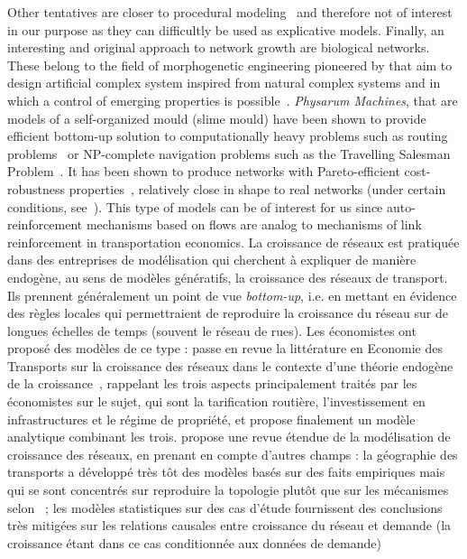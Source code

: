 {Other tentatives \cite{de2007netlogo,yamins2003growing} are closer to procedural modeling~\cite{lechner2004procedural,watson2008procedural} and therefore not of interest in our purpose as they can difficultly be used as explicative models. Finally, an interesting and original approach to network growth are biological networks. These belong to the field of morphogenetic engineering pioneered by  that aim to design artificial complex system inspired from natural complex systems and in which a control of emerging properties is possible~\cite{doursat2012morphogenetic}. \emph{Physarum Machines}, that are models of a self-organized mould (slime mould) have been shown to provide efficient bottom-up solution to computationally heavy problems such as routing problems~\cite{tero2006physarum} or NP-complete navigation problems such as the Travelling Salesman Problem~\cite{zhu2013amoeba}. It has been shown to produce networks with Pareto-efficient cost-robustness properties~\cite{tero2010rules}, relatively close in shape to real networks (under certain conditions, see~\cite{adamatzky2010road}). This type of models can be of interest for us since auto-reinforcement mechanisms based on flows are analog to mechanisms of link reinforcement in transportation economics.
}{
La croissance de réseaux est pratiquée dans des entreprises de modélisation qui cherchent à expliquer de manière endogène, au sens de modèles génératifs, la croissance des réseaux de transport. Ils prennent généralement un point de vue \emph{bottom-up}, i.e. en mettant en évidence des règles locales qui permettraient de reproduire la croissance du réseau sur de longues échelles de temps (souvent le réseau de rues). Les économistes ont proposé des modèles de ce type : \cite{zhang2007economics} passe en revue la littérature en Economie des Transports sur la croissance des réseaux dans le contexte d'une théorie endogène de la croissance~\cite{aghion1998endogenous}, rappelant les trois aspects principalement traités par les économistes sur le sujet, qui sont la tarification routière, l'investissement en infrastructures et le régime de propriété, et propose finalement un modèle analytique combinant les trois.
\cite{xie2009modeling} propose une revue étendue de la modélisation de croissance des réseaux, en prenant en compte d'autres champs : la géographie des transports a développé très tôt des modèles basés sur des faits empiriques mais qui se sont concentrés sur reproduire la topologie plutôt que sur les mécanismes selon~\cite{xie2009modeling} ; les modèles statistiques sur des cas d'étude fournissent des conclusions très mitigées sur les relations causales entre croissance du réseau et demande (la croissance étant dans ce cas conditionnée aux données de demande)
}
